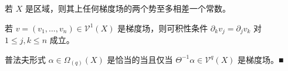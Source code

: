 \begin{remark}

\begin{items}
\item

若 $ X $ 是区域，则其上任何梯度场的两个势至多相差一个常数。

\item

若 $ v = (v_{1},\ldots,v_{n}) \in \mathcal{V}^{1}(X) $ 是梯度场，则可积性条件 $ \partial_{k}v_{j} = \partial_{j}v_{k} $ 对 $ 1 \le j,k \le n $ 成立。

\item

普法夫形式 $ \alpha \in \Omega_{(q)}(X) $ 是恰当的当且仅当 $ \Theta^{-1}\alpha \in \mathcal{V}^{q}(X) $ 是梯度场。\nobreak\hspace{0.35em}■

\end{items}

\end{remark}

